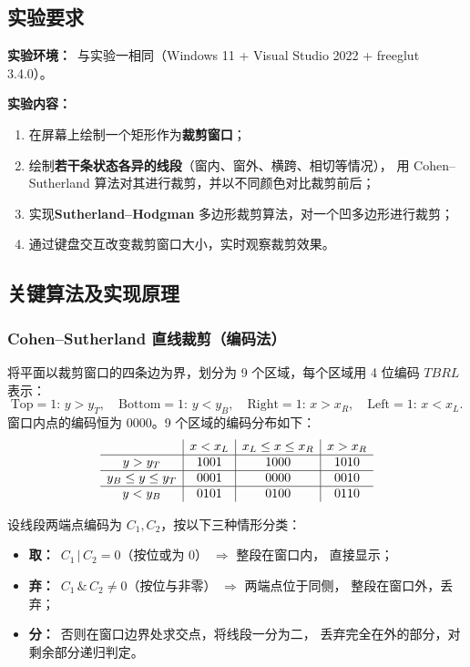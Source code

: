 \documentclass[a4paper,12pt]{ctexart}
\begin{document}
\subsection{实验要求}

\textbf{实验环境：}\ 与实验一相同（Windows 11 + Visual Studio 2022 + freeglut 3.4.0）。

\textbf{实验内容：}
\begin{enumerate}[leftmargin=2em,itemsep=0.2em]
    \item 在屏幕上绘制一个矩形作为\textbf{裁剪窗口}；
    \item 绘制\textbf{若干条状态各异的线段}（窗内、窗外、横跨、相切等情况），
        用 Cohen–Sutherland 算法对其进行裁剪，并以不同颜色对比裁剪前后；
    \item 实现\textbf{Sutherland–Hodgman} 多边形裁剪算法，对一个凹多边形进行裁剪；
    \item 通过键盘交互改变裁剪窗口大小，实时观察裁剪效果。
\end{enumerate}

\subsection{关键算法及实现原理}

\subsubsection{Cohen–Sutherland 直线裁剪（编码法）}

将平面以裁剪窗口的四条边为界，划分为 9 个区域，每个区域用 4 位编码 $TBRL$ 表示：
\[
    \text{Top} = 1{:}\,y>y_T,\quad
    \text{Bottom}=1{:}\,y<y_B,\quad
    \text{Right}=1{:}\,x>x_R,\quad
    \text{Left}=1{:}\,x<x_L .
\]
窗口内点的编码恒为 $0000$。9 个区域的编码分布如下：
\[
\begin{array}{c|c|c|c}
    \multicolumn{1}{l|}{}        & x<x_L & x_L\le x\le x_R & x>x_R \\\hline
    y>y_T          & 1001 & 1000 & 1010 \\\hline
    y_B\le y\le y_T& 0001 & 0000 & 0010 \\\hline
    y<y_B          & 0101 & 0100 & 0110
\end{array}
\]

设线段两端点编码为 $C_1,C_2$，按以下三种情形分类：

\begin{itemize}[leftmargin=2em,itemsep=0.2em]
    \item \textbf{取：}\ $C_1\,\big|\,C_2 = 0$（按位或为 $0$） $\Rightarrow$ 整段在窗口内，
        直接显示；
    \item \textbf{弃：}\ $C_1\,\&\,C_2 \ne 0$（按位与非零） $\Rightarrow$ 两端点位于同侧，
        整段在窗口外，丢弃；
    \item \textbf{分：}\ 否则在窗口边界处求交点，将线段一分为二，
        丢弃完全在外的部分，对剩余部分递归判定。
\end{itemize}
\end{document}
